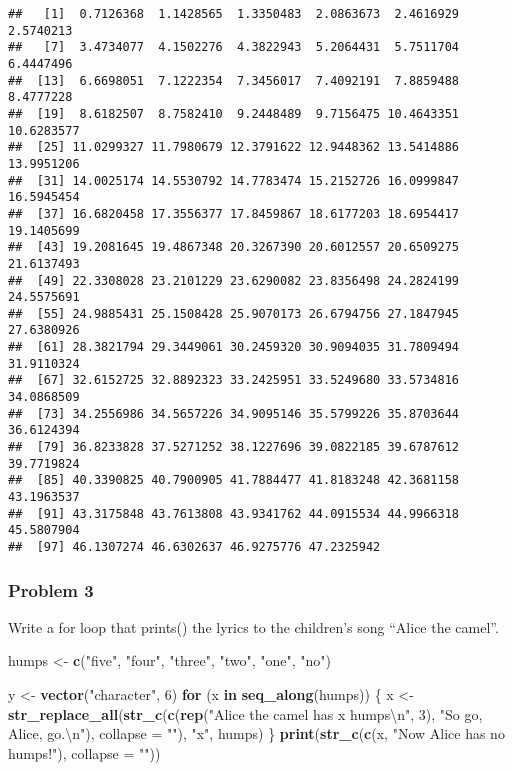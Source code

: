 \documentclass[]{article}
\newenvironment{Shaded}{\begin{snugshade}}{\end{snugshade}}
\newcommand{\KeywordTok}[1]{\textcolor[rgb]{0.13,0.29,0.53}{\textbf{#1}}}
\newcommand{\DataTypeTok}[1]{\textcolor[rgb]{0.13,0.29,0.53}{#1}}
\newcommand{\DecValTok}[1]{\textcolor[rgb]{0.00,0.00,0.81}{#1}}
\newcommand{\CharTok}[1]{\textcolor[rgb]{0.31,0.60,0.02}{#1}}
\newcommand{\StringTok}[1]{\textcolor[rgb]{0.31,0.60,0.02}{#1}}
\newcommand{\ControlFlowTok}[1]{\textcolor[rgb]{0.13,0.29,0.53}{\textbf{#1}}}
\newcommand{\NormalTok}[1]{#1}
\begin{document}
\begin{verbatim}
##   [1]  0.7126368  1.1428565  1.3350483  2.0863673  2.4616929  2.5740213
##   [7]  3.4734077  4.1502276  4.3822943  5.2064431  5.7511704  6.4447496
##  [13]  6.6698051  7.1222354  7.3456017  7.4092191  7.8859488  8.4777228
##  [19]  8.6182507  8.7582410  9.2448489  9.7156475 10.4643351 10.6283577
##  [25] 11.0299327 11.7980679 12.3791622 12.9448362 13.5414886 13.9951206
##  [31] 14.0025174 14.5530792 14.7783474 15.2152726 16.0999847 16.5945454
##  [37] 16.6820458 17.3556377 17.8459867 18.6177203 18.6954417 19.1405699
##  [43] 19.2081645 19.4867348 20.3267390 20.6012557 20.6509275 21.6137493
##  [49] 22.3308028 23.2101229 23.6290082 23.8356498 24.2824199 24.5575691
##  [55] 24.9885431 25.1508428 25.9070173 26.6794756 27.1847945 27.6380926
##  [61] 28.3821794 29.3449061 30.2459320 30.9094035 31.7809494 31.9110324
##  [67] 32.6152725 32.8892323 33.2425951 33.5249680 33.5734816 34.0868509
##  [73] 34.2556986 34.5657226 34.9095146 35.5799226 35.8703644 36.6124394
##  [79] 36.8233828 37.5271252 38.1227696 39.0822185 39.6787612 39.7719824
##  [85] 40.3390825 40.7900905 41.7884477 41.8183248 42.3681158 43.1963537
##  [91] 43.3175848 43.7613808 43.9341762 44.0915534 44.9966318 45.5807904
##  [97] 46.1307274 46.6302637 46.9275776 47.2325942
\end{verbatim}

\subsubsection*{Problem 3}\label{problem-3}

Write a for loop that prints() the lyrics to the children's song ``Alice
the camel''.

\begin{Shaded}
\begin{Highlighting}[]
\NormalTok{humps <-}\StringTok{ }\KeywordTok{c}\NormalTok{(}\StringTok{"five"}\NormalTok{, }\StringTok{"four"}\NormalTok{, }\StringTok{"three"}\NormalTok{, }\StringTok{"two"}\NormalTok{, }\StringTok{"one"}\NormalTok{, }\StringTok{"no"}\NormalTok{)}

\NormalTok{y <-}\StringTok{ }\KeywordTok{vector}\NormalTok{(}\StringTok{"character"}\NormalTok{, }\DecValTok{6}\NormalTok{)}
\ControlFlowTok{for}\NormalTok{ (x }\ControlFlowTok{in} \KeywordTok{seq_along}\NormalTok{(humps)) \{}
\NormalTok{  x <-}\StringTok{ }\KeywordTok{str_replace_all}\NormalTok{(}\KeywordTok{str_c}\NormalTok{(}\KeywordTok{c}\NormalTok{(}\KeywordTok{rep}\NormalTok{(}\StringTok{"Alice the camel has x humps}\CharTok{\textbackslash{}n}\StringTok{"}\NormalTok{, }\DecValTok{3}\NormalTok{), }\StringTok{"So go, Alice, go.}\CharTok{\textbackslash{}n}\StringTok{"}\NormalTok{), }\DataTypeTok{collapse =} \StringTok{""}\NormalTok{),}
                             \StringTok{"x"}\NormalTok{, humps)}
\NormalTok{\}}
\KeywordTok{print}\NormalTok{(}\KeywordTok{str_c}\NormalTok{(}\KeywordTok{c}\NormalTok{(x, }\StringTok{"Now Alice has no humps!"}\NormalTok{), }\DataTypeTok{collapse =} \StringTok{""}\NormalTok{))}
\end{Highlighting}
\end{Shaded}
\end{document}
